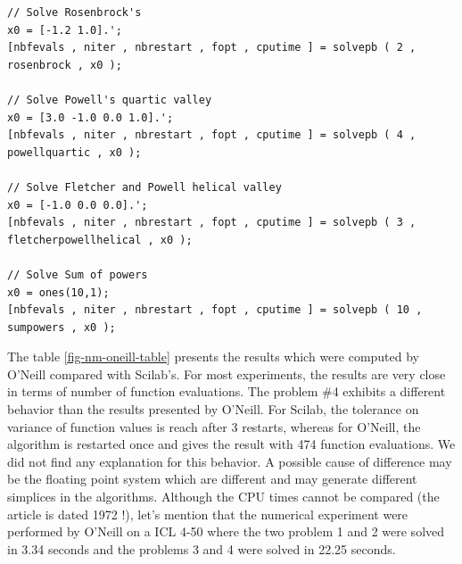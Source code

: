 \lstset{language=scilabscript}
\begin{lstlisting}
// Solve Rosenbrock's
x0 = [-1.2 1.0].';
[nbfevals , niter , nbrestart , fopt , cputime ] = solvepb ( 2 , rosenbrock , x0 );

// Solve Powell's quartic valley
x0 = [3.0 -1.0 0.0 1.0].';
[nbfevals , niter , nbrestart , fopt , cputime ] = solvepb ( 4 , powellquartic , x0 );

// Solve Fletcher and Powell helical valley
x0 = [-1.0 0.0 0.0].';
[nbfevals , niter , nbrestart , fopt , cputime ] = solvepb ( 3 , fletcherpowellhelical , x0 );

// Solve Sum of powers
x0 = ones(10,1);
[nbfevals , niter , nbrestart , fopt , cputime ] = solvepb ( 10 , sumpowers , x0 );
\end{lstlisting}

The table \ref{fig-nm-oneill-table} presents the results which were 
computed by O'Neill compared with Scilab's.
For most experiments, the results are very close in terms of 
number of function evaluations. 
The problem \#4 exhibits a different behavior than the 
results presented by O'Neill. For Scilab, the tolerance on variance 
of function values is reach after 3 restarts, whereas for O'Neill, the algorithm 
is restarted once and gives the result with 474 function evaluations. 
We did not find any explanation for this behavior. A possible cause of 
difference may be the floating point system which are different and may 
generate different simplices in the algorithms.
Although the CPU times cannot be 
compared (the article is dated 1972 !), let's mention 
that the numerical experiment were performed by O'Neill
on a ICL 4-50 where the two problem 1 and 2 were solved in 3.34 seconds
and the problems 3 and 4 were solved in 22.25 seconds.

